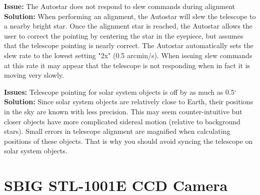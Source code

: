 \documentclass[12pt,titlepage]{article}
\renewcommand\deg{\mbox{$^\circ$}}
\begin{document}
\textbf{\flushleft Issue:} The Autostar does not respond to slew commands during alignment\\
\textbf{Solution:} When performing an alignment, the Autostar will slew the telescope to a nearby bright star. Once the alignment star is reached, the Autostar allows the user to correct the pointing by centering the star in the eyepiece, but assumes that the telescope pointing is nearly correct. The Autostar automatically sets the slew rate to the lowest setting "2x" (0.5 arcmin/s). When issuing slew commands at this rate it may appear that the telescope is not responding when in fact it is moving very slowly.


\textbf{\flushleft Issues:} Telescope pointing for solar system objects is off by as much as 0.5\deg\\
\textbf{Solution:}
Since solar system objects are relatively close to Earth, their positions in the sky are known with less precision. This may seem counter-intuitive but closer objects have more complicated sidereal motion (relative to background stars). Small errors in telescope alignment are magnified when calculating positions of these objects. That is why you should avoid syncing the telescope on solar system objects.

\section{SBIG STL-1001E CCD Camera}
\end{document}
